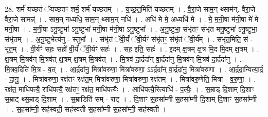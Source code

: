 \documentclass[17pt]{extarticle}
\begin{document}
28. शर्म॑ यच्छतं ॅयच्छतꣳ॒॒ शर्म॒ शर्म॑ यच्छतम् । . य॒च्छ॒त॒मिति॑ यच्छतम् । . वै॒रा॒जे साम॒न् थ्साम॑न्. वैरा॒जे वै॑रा॒जे सामन्न्॑ । . साम॒न् नध्यधि॒ साम॒न् थ्साम॒न् नधि॑ । . अधि॑ मे मे॒ अध्यधि॑ मे । . मे॒ म॒नी॒षा म॑नी॒षा मे॑ मे मनी॒षा । . म॒नी॒षा ऽनु॒ष्टुभा॑ ऽनु॒ष्टुभा॑ मनी॒षा म॑नी॒षा ऽनु॒ष्टुभा᳚ । . अ॒नु॒ष्टुभा॒ संभृ॑तꣳ॒॒ संभृ॑त मनु॒ष्टुभा॑ ऽनु॒ष्टुभा॒ संभृ॑तम् । . अ॒नु॒ष्टुभेत्य॑नु - स्तुभा᳚ । . संभृ॑तं ॅवी॒र्यं॑ ॅवी॒र्यꣳ॑ संभृ॑तꣳ॒॒ संभृ॑तं ॅवी॒र्य᳚म् । . संभृ॑त॒मिति॒ सं - भृ॒त॒म् । . वी॒र्यꣳ॑ सहः॒ सहो॑ वी॒र्यं॑ ॅवी॒र्यꣳ॑ सहः॑ । . सह॒ इति॒ सहः॑ । . इ॒दम् क्ष॒त्रम् क्ष॒त्र मि॒द मि॒दम् क्ष॒त्रम् । . क्ष॒त्रम् मि॒त्रव॑न् मि॒त्रव॑त् क्ष॒त्रम् क्ष॒त्रम् मि॒त्रव॑त् । . मि॒त्रव॑ दा॒र्द्रदा᳚न् वा॒र्द्रदा॑नु मि॒त्रव॑न् मि॒त्रव॑ दा॒र्द्रदा॑नु । . मि॒त्रव॒दिति॑ मि॒त्र - व॒त् । . आ॒र्द्रदा॑नु॒ मित्रा॑वरुणा॒ मित्रा॑वरुणा॒ ऽऽर्द्रदा᳚न् वा॒र्द्रदा॑नु॒ मित्रा॑वरुणा । . आ॒र्द्रदा॒न्वित्या॒र्द्र - दा॒नु॒ । . मित्रा॑वरुणा॒ रक्ष॑तꣳ॒॒ रक्ष॑त॒म् मित्रा॑वरुणा॒ मित्रा॑वरुणा॒ रक्ष॑तम् । . मित्रा॑वरु॒णेति॒ मित्रा᳚ - व॒रु॒णा॒ । . रक्ष॑त॒ माधि॑पत्यै॒ राधि॑पत्यै॒ रक्ष॑तꣳ॒॒ रक्ष॑त॒ माधि॑पत्यैः । . आधि॑पत्यै॒रित्याधि॑ - प॒त्यैः॒ । . स॒म्राड् दि॒शाम् दि॒शाꣳ स॒म्राट् थ्स॒म्राड् दि॒शाम् । . स॒म्राडिति॑ सम् - राट् । . दि॒शाꣳ स॒हसा᳚म्नी स॒हसा᳚म्नी दि॒शाम् दि॒शाꣳ स॒हसा᳚म्नी । . स॒हसा᳚म्नी॒ सह॑स्वती॒ सह॑स्वती स॒हसा᳚म्नी स॒हसा᳚म्नी॒ सह॑स्वती । \newline
\end{document}

